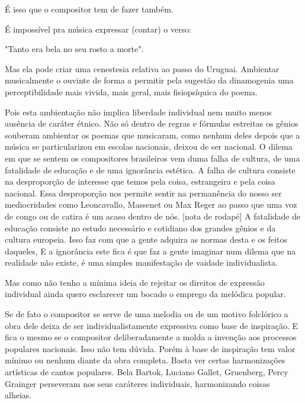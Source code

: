 É isso que o compositor tem de fazer também.~

É impossível pra música expressar (contar) o verso:~

"Tanto era bela no seu rosto a morte".~

Mas ela pode criar uma cenestesia relativa ao passo do Uruguai.
Ambientar musicalmente o ouvinte de forma a permitir pela sugestão da
dinamogenia uma perceptibilidade mais vivida, mais geral, mais
fisiopsíquica do poema.~

Pois esta ambientação não implica liberdade individual nem muito menos
ausência de caráter étnico. Não só dentro de regras e fórmulas estreitas
os gênios souberam ambientar os poemas que musicaram, como nenhum deles
depois que a música se particularizou em escolas nacionais, deixou de
ser nacional. O dilema em que se sentem os compositores brasileiros vem
duma falha de cultura, de uma fatalidade de educação e de uma ignorância
estética. A falha de cultura consiste na desproporção de interesse que
temos pela coisa, estrangeira e pela coisa nacional. Essa desproporção
nos permite sentir na permanência do nosso ser mediocridades como
Leoncavallo, Massenet ou Max Reger ao passo que uma voz de congo ou de
catira é um acaso dentro de nós. {[}nota de rodapé{]} A fatalidade de
educação consiste no estudo necessário e cotidiano dos grandes gênios e
da cultura europeia. Isso faz com que a gente adquira as normas desta e
os feitos daqueles, E a ignorância este fica é que faz a gente imaginar
num dilema que na realidade não existe, é uma simples manifestação de
vaidade individualista.~

Mas como não tenho a mínima ideia de rejeitar os direitos de expressão
individual ainda quero esclarecer um bocado o emprego da melódica
popular.

Se de fato o compositor se serve de uma melodia ou de um motivo
folclórico a obra dele deixa de ser individualistamente expressiva como
base de inspiração. E fica o mesmo se o compositor deliberadamente a
molda a invenção aos processos populares nacionais. Isso não tem dúvida.
Porém à base de inspiração tem valor mínimo ou nenhum diante da obra
completa. Basta ver certas harmonizações artísticas de cantos populares.
Bela Bartok, Luciano Gallet, Gruenberg, Percy Grainger perseveram nos
seus caráteres individuais, harmonizando coisas alheias.~

